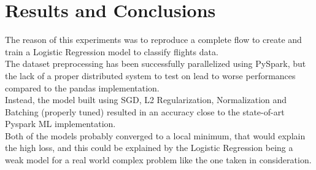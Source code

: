 \documentclass[
	letterpaper, %
	10pt, %
]{class}
\begin{document}

\section{Results and Conclusions}

The reason of this experiments was to reproduce a complete flow to create and train a Logistic Regression model to classify flights data.\\
The dataset preprocessing has been successfully parallelized using PySpark, but the lack of a proper distributed system to test on lead to worse performances compared to the pandas implementation.\\

Instead, the model built using SGD, L2 Regularization, Normalization and Batching (properly tuned) resulted in an accuracy close to the state-of-art Pyspark ML implementation.\\
Both of the models probably converged to a local minimum, that would explain the high loss, and this could be explained by the Logistic Regression being a weak model for a real world complex problem like the one taken in consideration.


\printbibliography %

\end{document}
